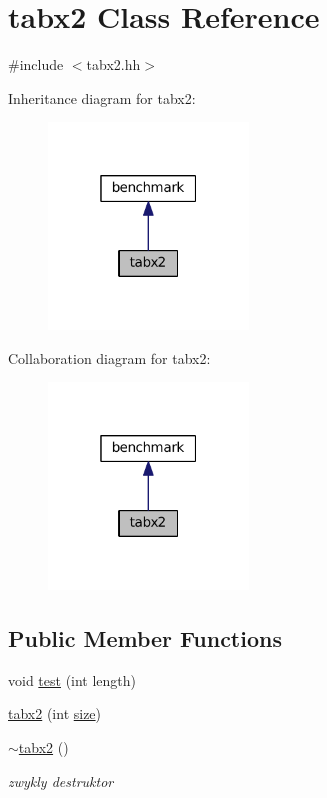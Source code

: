 \hypertarget{classtabx2}{}\section{tabx2 Class Reference}
\label{classtabx2}


{\ttfamily \#include $<$tabx2.\+hh$>$}



Inheritance diagram for tabx2\+:\nopagebreak
\begin{figure}[H]
\begin{center}
\leavevmode
\includegraphics[width=151pt]{db/da6/classtabx2__inherit__graph}
\end{center}
\end{figure}


Collaboration diagram for tabx2\+:\nopagebreak
\begin{figure}[H]
\begin{center}
\leavevmode
\includegraphics[width=151pt]{d2/d98/classtabx2__coll__graph}
\end{center}
\end{figure}
\subsection*{Public Member Functions}
\begin{DoxyCompactItemize}
\item 
void \hyperlink{classtabx2_a41eea5dffaea0a866db5c574129c0ee4}{test} (int length)
\item 
\hyperlink{classtabx2_a68be0fc6ed6ce41d56011a6f5bad1b00}{tabx2} (int \hyperlink{classtabx2_a9a6db4f12091baed13f8bad9b9538766}{size})
\item 
\hyperlink{classtabx2_a6e259fbc3e5791ae3a11df988a8369c0}{$\sim$tabx2} ()
\begin{DoxyCompactList}\small\item\em zwykly destruktor \end{DoxyCompactList}\end{DoxyCompactItemize}
